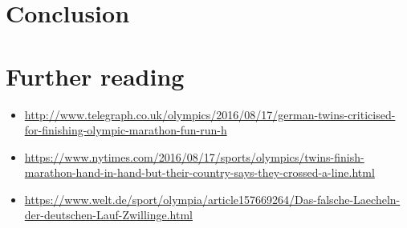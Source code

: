 \documentclass[12pt,titlepage]{article}
\begin{document}
\section*{Conclusion}


\newpage
\section*{Further reading}

\begin{itemize}

\item \url{http://www.telegraph.co.uk/olympics/2016/08/17/german-twins-criticised-for-finishing-olympic-marathon-fun-run-h}

\item
  \url{https://www.nytimes.com/2016/08/17/sports/olympics/twins-finish-marathon-hand-in-hand-but-their-country-says-they-crossed-a-line.html}

\item
  \url{https://www.welt.de/sport/olympia/article157669264/Das-falsche-Laecheln-der-deutschen-Lauf-Zwillinge.html}
\end{itemize}
\end{document}

